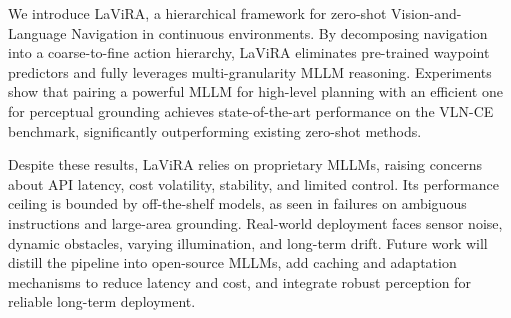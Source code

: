 \documentclass[letterpaper, 10 pt, conference]{ieeeconf}
\begin{document}


We introduce LaViRA, a hierarchical framework for zero-shot Vision-and-Language Navigation in continuous environments. By decomposing navigation into a coarse-to-fine action hierarchy, LaViRA eliminates pre-trained waypoint predictors and fully leverages multi-granularity MLLM reasoning. Experiments show that pairing a powerful MLLM for high-level planning with an efficient one for perceptual grounding achieves state-of-the-art performance on the VLN-CE benchmark, significantly outperforming existing zero-shot methods.

Despite these results, LaViRA relies on proprietary MLLMs, raising concerns about API latency, cost volatility, stability, and limited control. Its performance ceiling is bounded by off-the-shelf models, as seen in failures on ambiguous instructions and large-area grounding. Real-world deployment faces sensor noise, dynamic obstacles, varying illumination, and long-term drift. Future work will distill the pipeline into open-source MLLMs, add caching and adaptation mechanisms to reduce latency and cost, and integrate robust perception for reliable long-term deployment.



\end{document}

